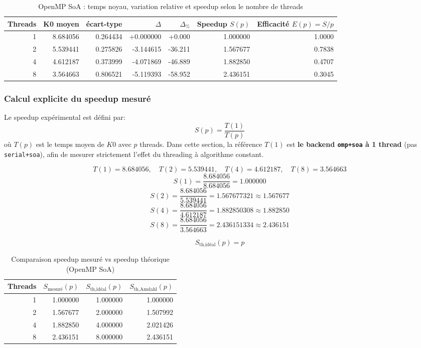 \begin{table}[H]
\centering
\scriptsize
\caption{OpenMP SoA : temps noyau, variation relative et speedup selon le nombre de threads}
\label{tab:omp-speedup}
\begin{tabular}{@{}rrrrrrr@{}}
\toprule
\textbf{Threads} & \textbf{K0 moyen} & \textbf{écart-type} & \textbf{\(\Delta\)} & \textbf{\(\Delta_{\%}\)} & \textbf{Speedup \(S(p)\)} & \textbf{Efficacité \(E(p)=S/p\)} \\
\midrule
1 & 8.684056 & 0.264434 & +0.000000 & +0.000 & 1.000000 & 1.0000 \\
2 & 5.539441 & 0.275826 & -3.144615 & -36.211 & 1.567677 & 0.7838 \\
4 & 4.612187 & 0.373999 & -4.071869 & -46.889 & 1.882850 & 0.4707 \\
8 & 3.564663 & 0.806521 & -5.119393 & -58.952 & 2.436151 & 0.3045 \\
\bottomrule
\end{tabular}
\end{table}

\subsubsection{Calcul explicite du speedup mesuré}

Le speedup expérimental est défini par:
\[
S(p)=\frac{T(1)}{T(p)}
\]
où \(T(p)\) est le temps moyen de \(K0\) avec \(p\) threads.
Dans cette section, la référence \(T(1)\) est \textbf{le backend \texttt{omp+soa} à 1 thread}
(pas \texttt{serial+soa}), afin de mesurer strictement l'effet du threading à algorithme constant.

\[
T(1)=8.684056,\quad
T(2)=5.539441,\quad
T(4)=4.612187,\quad
T(8)=3.564663
\]
\[
S(1)=\frac{8.684056}{8.684056}=1.000000
\]
\[
S(2)=\frac{8.684056}{5.539441}=1.567677321 \approx 1.567677
\]
\[
S(4)=\frac{8.684056}{4.612187}=1.882850308 \approx 1.882850
\]
\[
S(8)=\frac{8.684056}{3.564663}=2.436151334 \approx 2.436151
\]

\[
S_{\text{th,idéal}}(p)=p
\]

\begin{table}[H]
\centering
\caption{Comparaison speedup mesuré vs speedup théorique (OpenMP SoA)}
\label{tab:omp-speedup-theory}
\begin{tabular}{@{}rrrr@{}}
\toprule
\textbf{Threads} & \textbf{\(S_{\text{mesuré}}(p)\)} & \textbf{\(S_{\text{th,idéal}}(p)\)} & \textbf{\(S_{\text{th,Amdahl}}(p)\)} \\
\midrule
1 & 1.000000 & 1.000000 & 1.000000 \\
2 & 1.567677 & 2.000000 & 1.507992 \\
4 & 1.882850 & 4.000000 & 2.021426 \\
8 & 2.436151 & 8.000000 & 2.436151 \\
\bottomrule
\end{tabular}
\end{table}

